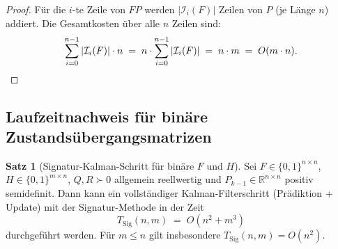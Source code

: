 ﻿\documentclass[a4paper,12pt]{article}
\theoremstyle{definition}
\newtheorem{satz}{Satz}
\begin{document}
\begin{proof}
Für die $i$-te Zeile von $FP$ werden $|\mathcal{I}_i(F)|$ Zeilen von $P$
(je Länge $n$) addiert. Die Gesamtkosten über alle $n$ Zeilen sind:
\[
    \sum_{i=0}^{n-1} |\mathcal{I}_i(F)| \cdot n \;=\; n \cdot \sum_{i=0}^{n-1}|\mathcal{I}_i(F)|
    \;=\; n \cdot m \;=\; O(m \cdot n). \qedhere
\]
\end{proof}

\subsection{Laufzeitnachweis für binäre Zustandsübergangsmatrizen}

\begin{satz}[Signatur-Kalman-Schritt für binäre $F$ und $H$]
\label{satz:bin_kalman}
    Sei $F \in \{0,1\}^{n \times n}$, $H \in \{0,1\}^{m \times n}$,
    $Q, R \succ 0$ allgemein reellwertig und $P_{k-1} \in \mathbb{R}^{n \times n}$
    positiv semidefinit. Dann kann ein vollständiger Kalman-Filterschritt
    (Prädiktion + Update) mit der Signatur-Methode in der Zeit
    \[
        T_{\mathrm{Sig}}(n, m) \;=\; O(n^2 + m^3)
    \]
    durchgeführt werden. Für $m \leq n$ gilt insbesondere $T_{\mathrm{Sig}}(n,m) = O(n^2)$.
\end{satz}
\end{document}
